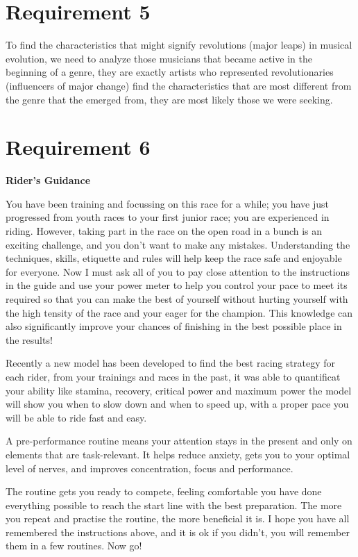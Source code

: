 \documentclass[12pt]{article}
\begin{document}
\section{Requirement 5}
To find the characteristics that might signify revolutions (major leaps) in musical evolution, we need to analyze those musicians that became active in the beginning of
a genre, they are exactly artists who represented revolutionaries (influencers of major
change) find the characteristics that are most different from the genre that the emerged from, they are most likely those we were seeking.
\newpage
\section{Requirement 6}
\begin{center}
    \huge \textbf{Rider's Guidance}
\end{center}\large
You have been training and focussing on this race for a while; you  have just progressed from youth races to your first junior race; you are experienced in riding. 
However, taking part in the race on the open road in a bunch is an exciting challenge, and you don’t want to make any mistakes. 
Understanding the techniques, skills, etiquette and rules will help keep the race safe and enjoyable for everyone. Now I must ask all of you to pay close attention to the instructions in the guide and use your power meter
to help you control your pace to meet its required so that you can make the best of yourself without hurting yourself with the high tensity of the race and your eager for
the champion. This knowledge can also significantly improve your chances of finishing in the best possible place in the results! 

Recently a new model has been developed to find the best racing strategy for each rider, from your trainings and races in the past, it was able to quantificat your ability
like stamina, recovery, critical power and maximum power the model will show you when to slow down and when to speed up, with a proper pace you will be able to ride 
fast and easy. 

A pre-performance routine means your attention stays in the present and only on elements that are task-relevant. It helps reduce anxiety, gets you to your optimal level 
of nerves, and improves concentration, focus and performance.

The routine gets you ready to compete, feeling comfortable you have done everything possible to reach the start line with the best preparation. The more you repeat and 
practise the routine, the more beneficial it is. I hope you have all remembered the instructions above, and it is ok if you didn't, you will remember them in a few routines.
Now go!


\end{document}

